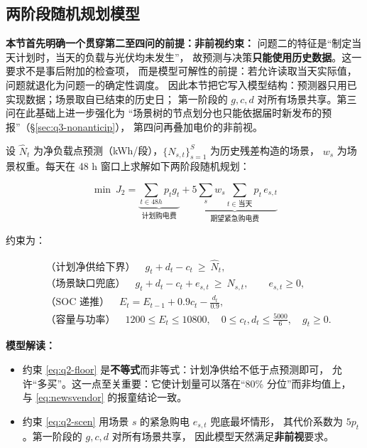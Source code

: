 \subsection{两阶段随机规划模型}

\textbf{本节首先明确一个贯穿第二至四问的前提：非前视约束：}
问题二的特征是“制定当天计划时，当天的负载与光伏均未发生”，
故预测与决策\textbf{只能使用历史数据}。这一要求不是事后附加的检查项，
而是模型可解性的前提：若允许读取当天实际值，问题就退化为问题一的确定性调度。
因此本节把它写入模型结构：预测器只用已实现数据；场景取自已结束的历史日；
第一阶段的 $g,c,d$ 对所有场景共享。第三问在此基础上进一步强化为
“场景树的节点划分也只能依据届时新发布的预报”（\S\ref{sec:q3-nonanticip}），
第四问再叠加电价的非前视。

设 $\hat N_t$ 为净负载点预测（kWh/段），$\{N_{s,t}\}_{s=1}^{S}$ 为历史残差构造的场景，
$w_s$ 为场景权重。每天在 48 h 窗口上求解如下两阶段随机规划：

\begin{equation}
\min\ J_2=\underbrace{\sum_{t\in 48h} p_tg_t}_{\text{计划购电费}}
+\underbrace{5\sum_{s}w_s\sum_{t\in \text{当天}} p_t\,e_{s,t}}_{\text{期望紧急购电费}}
\label{eq:q2-obj}
\end{equation}

约束为：

\begin{align}
&\text{（计划净供给下界）}\quad g_t+d_t-c_t\ \ge\ \hat N_t, \label{eq:q2-floor}\\
&\text{（场景缺口兜底）}\quad g_t+d_t-c_t+e_{s,t}\ \ge\ N_{s,t},\qquad e_{s,t}\ge 0, \label{eq:q2-scen}\\
&\text{（SOC 递推）}\quad E_t=E_{t-1}+0.9c_t-\frac{d_t}{0.9}, \label{eq:q2-soc}\\
&\text{（容量与功率）}\quad 1200\le E_t\le 10800,\quad 0\le c_t,d_t\le \frac{5000}{6},\quad g_t\ge0. \label{eq:q2-cap}
\end{align}

\textbf{模型解读：}
\begin{itemize}[itemsep=2pt,topsep=3pt]
  \item 约束 \eqref{eq:q2-floor} 是\textbf{不等式}而非等式：计划净供给不低于点预测即可，
        允许“多买”。这一点至关重要：它使计划量可以落在“80\% 分位”而非均值上，
        与 \eqref{eq:newsvendor} 的报童结论一致。
  \item 约束 \eqref{eq:q2-scen} 用场景 $s$ 的紧急购电 $e_{s,t}$ 兜底最坏情形，
        其代价系数为 $5p_t$。第一阶段的 $g,c,d$ 对所有场景共享，
        因此模型天然满足\textbf{非前视}要求。
\end{itemize}


